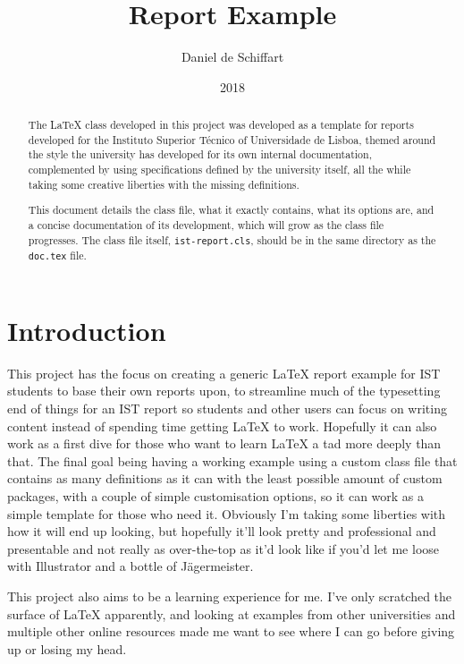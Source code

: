 \documentclass[palatino,english]{ist-report}
\begin{document}
\thispagestyle{empty}

\title{Report Example}
\author{Daniel de Schiffart}
\date{2018}
\maketitle{}

{\hypersetup{linkcolor = black} \tableofcontents}

\begin{abstract}
	The \LaTeX{} class developed in this project was developed as a template for reports developed for the Instituto Superior Técnico of Universidade de Lisboa, themed around the style the university has developed for its own internal documentation, complemented by using specifications defined by the university itself, all the while taking some creative liberties with the missing definitions.
	
	This document details the class file, what it exactly contains, what its options are, and a concise documentation of its development, which will grow as the class file progresses. The class file itself, \texttt{ist-report.cls}, should be in the same directory as the \texttt{doc.tex} file.
\end{abstract}

\section{Introduction}

This project has the focus on creating a generic \LaTeX{} report example for IST students to base their own reports upon, to streamline much of the typesetting end of things for an IST report so students and other users can focus on writing content instead of spending time getting \LaTeX{} to work. Hopefully it can also work as a first dive for those who want to learn \LaTeX{} a tad more deeply than that. The final goal being having a working example using a custom class file that contains as many definitions as it can with the least possible amount of custom packages, with a couple of simple customisation options, so it can work as a simple template for those who need it. Obviously I'm taking some liberties with how it will end up looking, but hopefully it'll look pretty and professional and presentable and not really as over-the-top as it'd look like if you'd let me loose with Illustrator and a bottle of Jägermeister.

This project also aims to be a learning experience for me. I've only scratched the surface of \LaTeX{} apparently, and looking at examples from other universities and multiple other online resources made me want to see where I can go before giving up or losing my head.
\end{document}
